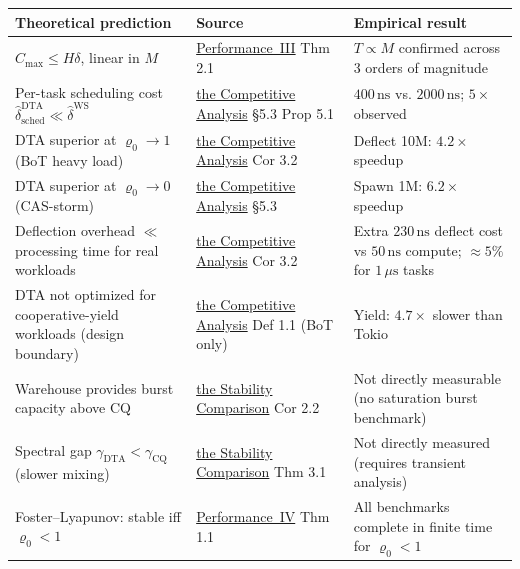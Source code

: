 \documentclass[11pt,a4paper]{article}
\begin{document}
\begin{center}
\renewcommand{\arraystretch}{1.4}
\begin{tabular}{p{4.2cm}p{4.2cm}p{4.2cm}}
\toprule
Theoretical prediction & Source & Empirical result \\
\midrule
$C_{\max} \le H\delta$, linear in $M$ &
\hyperref[chap:makespan]{Performance~III} Thm 2.1 &
$T \propto M$ confirmed across 3 orders of magnitude \\
\midrule
Per-task scheduling cost $\hat\delta_{\mathrm{sched}}^{\mathrm{DTA}} \ll \hat\delta^{\mathrm{WS}}$ &
\hyperref[chap:competitive_ratio]{the Competitive Analysis} \S5.3 Prop 5.1 &
$400\,\mathrm{ns}$ vs. $2000\,\mathrm{ns}$; $5\times$ observed \\
\midrule
DTA superior at $\varrho_0 \to 1$ (BoT heavy load) &
\hyperref[chap:competitive_ratio]{the Competitive Analysis} Cor 3.2 &
Deflect 10M: $4.2\times$ speedup \\
\midrule
DTA superior at $\varrho_0 \to 0$ (CAS-storm) &
\hyperref[chap:competitive_ratio]{the Competitive Analysis} \S5.3 &
Spawn 1M: $6.2\times$ speedup \\
\midrule
Deflection overhead $\ll$ processing time for real workloads &
\hyperref[chap:competitive_ratio]{the Competitive Analysis} Cor 3.2 &
Extra $230\,\mathrm{ns}$ deflect cost vs $50\,\mathrm{ns}$ compute; $\approx 5\%$ for $1\,\mu\mathrm{s}$ tasks \\
\midrule
DTA not optimized for cooperative-yield workloads (design boundary) &
\hyperref[chap:competitive_ratio]{the Competitive Analysis} Def 1.1 (BoT only) &
Yield: $4.7\times$ slower than Tokio \\
\midrule
Warehouse provides burst capacity above CQ &
\hyperref[chap:stability_compare]{the Stability Comparison} Cor 2.2 &
Not directly measurable (no saturation burst benchmark) \\
\midrule
Spectral gap $\gamma_{\mathrm{DTA}} < \gamma_{\mathrm{CQ}}$ (slower mixing) &
\hyperref[chap:stability_compare]{the Stability Comparison} Thm 3.1 &
Not directly measured (requires transient analysis) \\
\midrule
Foster--Lyapunov: stable iff $\varrho_0 < 1$ &
\hyperref[chap:stability]{Performance~IV} Thm 1.1 &
All benchmarks complete in finite time for $\varrho_0 < 1$ \\
\bottomrule
\end{tabular}
\end{center}

\end{document}
